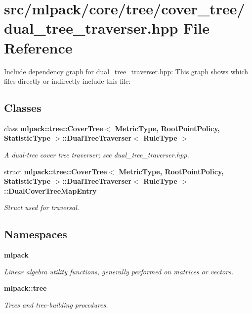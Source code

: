 \section{src/mlpack/core/tree/cover\-\_\-tree/dual\-\_\-tree\-\_\-traverser.hpp File Reference}
\label{cover__tree_2dual__tree__traverser_8hpp}
Include dependency graph for dual\-\_\-tree\-\_\-traverser.\-hpp\-:
This graph shows which files directly or indirectly include this file\-:
\subsection*{Classes}
\begin{DoxyCompactItemize}
\item 
class {\bf mlpack\-::tree\-::\-Cover\-Tree$<$ Metric\-Type, Root\-Point\-Policy, Statistic\-Type $>$\-::\-Dual\-Tree\-Traverser$<$ Rule\-Type $>$}
\begin{DoxyCompactList}\small\item\em A dual-\/tree cover tree traverser; see dual\-\_\-tree\-\_\-traverser.\-hpp. \end{DoxyCompactList}\item 
struct {\bf mlpack\-::tree\-::\-Cover\-Tree$<$ Metric\-Type, Root\-Point\-Policy, Statistic\-Type $>$\-::\-Dual\-Tree\-Traverser$<$ Rule\-Type $>$\-::\-Dual\-Cover\-Tree\-Map\-Entry}
\begin{DoxyCompactList}\small\item\em Struct used for traversal. \end{DoxyCompactList}\end{DoxyCompactItemize}
\subsection*{Namespaces}
\begin{DoxyCompactItemize}
\item 
{\bf mlpack}
\begin{DoxyCompactList}\small\item\em Linear algebra utility functions, generally performed on matrices or vectors. \end{DoxyCompactList}\item 
{\bf mlpack\-::tree}
\begin{DoxyCompactList}\small\item\em Trees and tree-\/building procedures. \end{DoxyCompactList}\end{DoxyCompactItemize}
